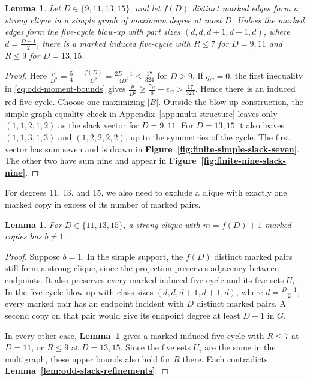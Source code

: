 \documentclass[preprint,11pt,numbers]{elsarticle-arxiv}
\numberwithin{equation}{section}
\newtheorem{lemma}[theorem]{Lemma}
\theoremstyle{definition}
\begin{document}
\begin{lemma}\label{lem:supp-simple-equality}
Let $D\in\{9,11,13,15\}$, and let $f(D)$ distinct marked edges form
a strong clique in a simple graph of maximum degree at most $D$.
Unless the marked edges form the five-cycle blow-up with part sizes
$(d,d,d+1,d+1,d)$, where $d=\frac{D-1}{2}$, there is a marked
induced five-cycle with $R\le7$ for $D=9,11$ and $R\le9$ for $D=13,15$.
\end{lemma}

\begin{proof}
Here $\frac{\mu}{D^2}=\frac{5}{4}-\frac{f(D)}{D^2}
=\frac{2D-1}{4D^2}\le\frac{17}{324}$ for $D\ge9$.
If $q_C=0$, the first inequality in \eqref{eq:odd-moment-bounds}
gives $\frac{\mu}{D^2}\ge\frac{\gamma_C}{8}-\epsilon_C
>\frac{17}{324}$. Hence there is an induced red five-cycle.
Choose one maximizing $|B|$. Outside the blow-up construction, the simple-graph equality
check in Appendix~\ref{app:multi-structure} leaves only
$(1,1,2,1,2)$ as the slack vector for $D=9,11$. For $D=13,15$ it
also leaves $(1,1,3,1,3)$ and $(1,2,2,2,2)$, up to the symmetries
of the cycle. The first vector has sum seven and is drawn in
\textbf{Figure~\ref{fig:finite-simple-slack-seven}}. The other two
have sum nine and appear in \textbf{Figure~\ref{fig:finite-nine-slack-nine}}.
\end{proof}

For degrees 11, 13, and 15, we also need to exclude a clique with
exactly one marked copy in excess of its number of marked pairs.

\begin{lemma}\label{lem:single-extra-copy}
For $D\in\{11,13,15\}$, a strong clique with $m=f(D)+1$ marked
copies has $b\ne1$.
\end{lemma}

\begin{proof}
Suppose $b=1$. In the simple support, the $f(D)$ distinct marked
pairs still form a strong clique, since the projection preserves
adjacency between endpoints. It also preserves every marked induced
five-cycle and its five sets $U_i$. In the five-cycle blow-up with class sizes
$(d,d,d+1,d+1,d)$, where $d=\frac{D-1}{2}$, every marked pair has
an endpoint incident with $D$ distinct marked pairs. A second copy
on that pair would give its endpoint degree at least $D+1$ in $G$.

In every other case, \textbf{Lemma~\ref{lem:supp-simple-equality}}
gives a marked induced five-cycle with $R\le7$ at $D=11$, or
$R\le9$ at $D=13,15$. Since the five sets $U_i$ are the same
in the multigraph, these upper bounds
also hold for $R$ there. Each contradicts
\textbf{Lemma~\ref{lem:odd-slack-refinements}}.
\end{proof}
\end{document}

